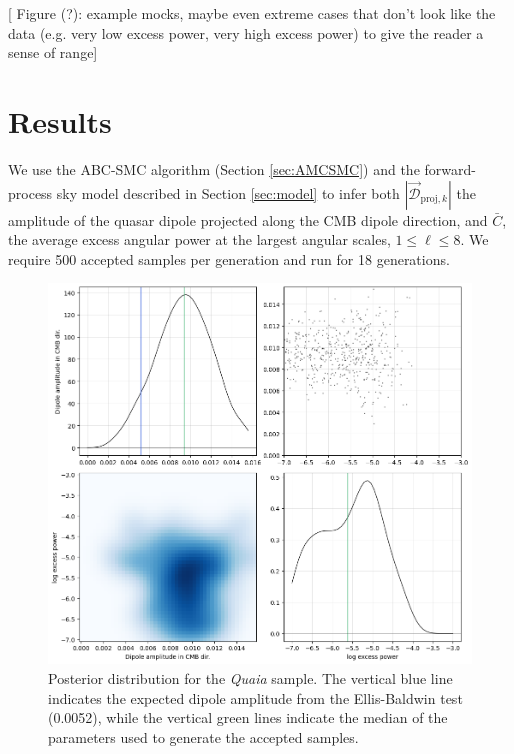 \documentclass[modern]{aastex631}
\newcommand{\quaia}{\textsl{Quaia}\xspace}
\begin{document}
[ Figure (?): example mocks, maybe even extreme cases that don't look like the data (e.g. very low excess power, very high excess power) to give the reader a sense of range]


\section{Results}
\label{sec:results}

We use the ABC-SMC algorithm (Section \ref{sec:AMCSMC}) and the forward-process sky model described in Section \ref{sec:model} to infer both $|\vec{\mathcal{D}}_{\mathrm{proj},k}|$ the amplitude of the quasar dipole projected along the CMB dipole direction, and $\bar C$, the average excess angular power at the largest angular scales, $1\le\ell\le 8$.
We require 500 accepted samples per generation and run for 18 generations.

\begin{figure}
    \centering
    \includegraphics[width=0.9\linewidth]{images/quaia_ABC_posterior.png}
    \caption{Posterior distribution for the \quaia sample. The vertical blue line indicates the expected dipole amplitude from the Ellis-Baldwin test (0.0052), while the vertical green lines indicate the median of the parameters used to generate the accepted samples.}
    \label{fig:quaia_posterior}
\end{figure}
\end{document}
